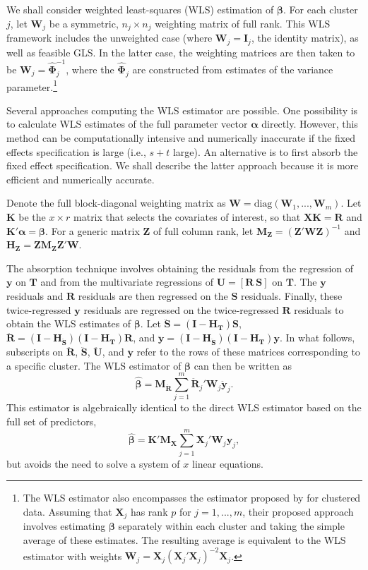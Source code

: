 \documentclass[12pt]{article}\usepackage[]{graphicx}\usepackage[]{color}
\newcommand{\bm}{\mathbf}
\newcommand{\bs}{\boldsymbol}
\begin{document}
We shall consider weighted least-squares (WLS) estimation of $\bs\beta$. 
For each cluster $j$, let $\bm{W}_j$ be a symmetric, $n_j \times n_j$ weighting matrix of full rank. This WLS framework includes the unweighted case (where $\bm{W}_j = \bm{I}_j$, the identity matrix), as well as feasible GLS. In the latter case, the weighting matrices are then taken to be $\bm{W}_j = \hat{\bs\Phi}_j^{-1}$, where the $\hat{\bs\Phi}_j$ are constructed from estimates of the variance parameter.\footnote{
The WLS estimator also encompasses the estimator proposed by \citet{Ibragimov2010tstatistic} for clustered data. 
Assuming that $\bm{X}_j$ has rank $p$ for $j = 1,...,m$, their proposed approach involves estimating $\bs\beta$ separately within each cluster and taking the simple average of these estimates. 
The resulting average is equivalent to the WLS estimator with weights $\bm{W}_j = \bm{X}_j \left(\bm{X}_j'\bm{X}_j\right)^{-2} \bm{X}_j$.}

Several approaches computing the WLS estimator are possible. One possibility is to calculate WLS estimates of the full parameter vector $\bs\alpha$ directly. However, this method can be computationally intensive and numerically inaccurate if the fixed effects specification is large (i.e., $s + t$ large). An alternative is to first absorb the fixed effect specification. We shall describe the latter approach because it is more efficient and numerically accurate.

Denote the full block-diagonal weighting matrix as $\bm{W} = \text{diag}\left(\bm{W}_1,...,\bm{W}_m\right)$.
Let $\bm{K}$ be the $x \times r$ matrix that selects the covariates of interest, so that $\bm{X} \bm{K} = \bm{R}$ and $\bm{K}'\bs\alpha = \bs\beta$.
For a generic matrix $\bm{Z}$ of full column rank, let $\bm{M_Z} = \left(\bm{Z}'\bm{W}\bm{Z}\right)^{-1}$ and $\bm{H_Z} = \bm{Z}\bm{M_Z}\bm{Z}'\bm{W}$. 

The absorption technique involves obtaining the residuals from the regression of $\bm{y}$ on $\bm{T}$ and from the multivariate regressions of $\bm{U} = [\bm{R}\ \bm{S}]$ on $\bm{T}$. The $\bm{y}$ residuals and $\bm{R}$ residuals are then regressed on the $\bm{S}$ residuals. Finally, these twice-regressed $\bm{y}$ residuals are regressed on the twice-regressed $\bm{R}$ residuals to obtain the WLS estimates of $\bs\beta$. Let $\bm{\ddot{S}} = \left(\bm{I} - \bm{H_T}\right)\bm{S}$, $\bm{\ddot{R}} = \left(\bm{I} - \bm{H_{\ddot{S}}}\right)\left(\bm{I} - \bm{H_T}\right)\bm{R}$, and $\bm{\ddot{y}} = \left(\bm{I} - \bm{H_{\ddot{S}}}\right)\left(\bm{I} - \bm{H_T}\right)\bm{y}$. In what follows, subscripts on $\bm{\ddot{R}}$, $\bm{\ddot{S}}$,  $\bm{\ddot{U}}$, and $\bm{\ddot{y}}$ refer to the rows of these matrices corresponding to a specific cluster. The WLS estimator of $\bs\beta$ can then be written as
\begin{equation}
\label{eq:WLS}
\bs{\hat\beta} = \bm{M_{\ddot{R}}} \sum_{j=1}^m \bm{\ddot{R}}_j' \bm{W}_j \bm{\ddot{y}}_j. 
\end{equation}
This estimator is algebraically identical to the direct WLS estimator based on the full set of predictors, \[
\bs{\hat\beta} = \bm{K}'\bm{M_X} \sum_{j=1}^m \bm{X}_j' \bm{W}_j \bm{y}_j,
\]
but avoids the need to solve a system of $x$ linear equations.
\end{document}
